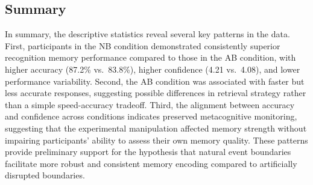 \subsection{Summary}

In summary, the descriptive statistics reveal several key patterns in the data. First, participants in the NB condition demonstrated consistently superior recognition memory performance compared to those in the AB condition, with higher accuracy (87.2\% vs.\ 83.8\%), higher confidence (4.21 vs.\ 4.08), and lower performance variability. Second, the AB condition was associated with faster but less accurate responses, suggesting possible differences in retrieval strategy rather than a simple speed-accuracy tradeoff. Third, the alignment between accuracy and confidence across conditions indicates preserved metacognitive monitoring, suggesting that the experimental manipulation affected memory strength without impairing participants' ability to assess their own memory quality. These patterns provide preliminary support for the hypothesis that natural event boundaries facilitate more robust and consistent memory encoding compared to artificially disrupted boundaries.

